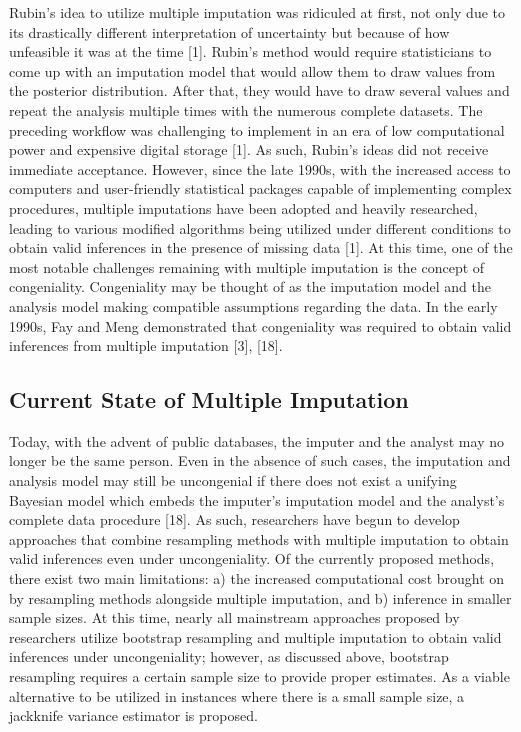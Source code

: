 \documentclass[
  letterpaper,
  DIV=11,
  numbers=noendperiod]{scrreprt}
\begin{document}
Rubin's idea to utilize multiple imputation was ridiculed at first, not
only due to its drastically different interpretation of uncertainty but
because of how unfeasible it was at the time {[}1{]}. Rubin's method
would require statisticians to come up with an imputation model that
would allow them to draw values from the posterior distribution. After
that, they would have to draw several values and repeat the analysis
multiple times with the numerous complete datasets. The preceding
workflow was challenging to implement in an era of low computational
power and expensive digital storage {[}1{]}. As such, Rubin's ideas did
not receive immediate acceptance. However, since the late 1990s, with
the increased access to computers and user-friendly statistical packages
capable of implementing complex procedures, multiple imputations have
been adopted and heavily researched, leading to various modified
algorithms being utilized under different conditions to obtain valid
inferences in the presence of missing data {[}1{]}. At this time, one of
the most notable challenges remaining with multiple imputation is the
concept of congeniality. Congeniality may be thought of as the
imputation model and the analysis model making compatible assumptions
regarding the data. In the early 1990s, Fay and Meng demonstrated that
congeniality was required to obtain valid inferences from multiple
imputation {[}3{]}, {[}18{]}.

\hypertarget{current-state-of-multiple-imputation}{%
\subsection{Current State of Multiple
Imputation}\label{current-state-of-multiple-imputation}}

Today, with the advent of public databases, the imputer and the analyst
may no longer be the same person. Even in the absence of such cases, the
imputation and analysis model may still be uncongenial if there does not
exist a unifying Bayesian model which embeds the imputer's imputation
model and the analyst's complete data procedure {[}18{]}. As such,
researchers have begun to develop approaches that combine resampling
methods with multiple imputation to obtain valid inferences even under
uncongeniality. Of the currently proposed methods, there exist two main
limitations: a) the increased computational cost brought on by
resampling methods alongside multiple imputation, and b) inference in
smaller sample sizes. At this time, nearly all mainstream approaches
proposed by researchers utilize bootstrap resampling and multiple
imputation to obtain valid inferences under uncongeniality; however, as
discussed above, bootstrap resampling requires a certain sample size to
provide proper estimates. As a viable alternative to be utilized in
instances where there is a small sample size, a jackknife variance
estimator is proposed.
\end{document}

